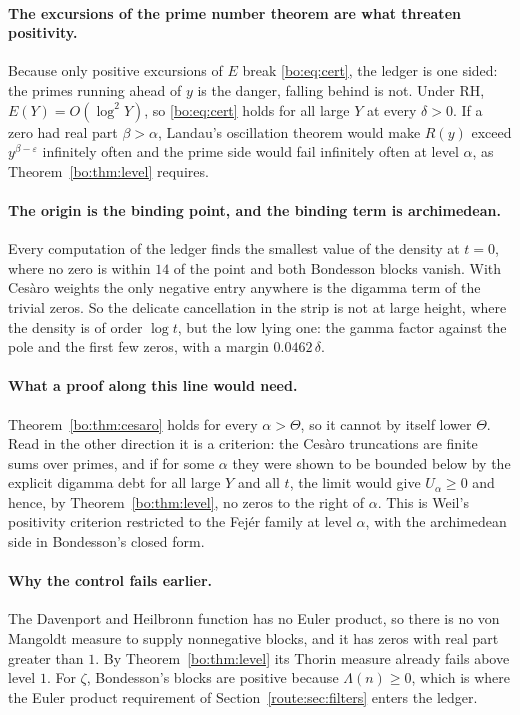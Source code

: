 \paragraph{The excursions of the prime number theorem are what threaten positivity.} Because only positive excursions of $E$ break \eqref{bo:eq:cert}, the ledger is one sided: the primes running ahead of $y$ is the danger, falling behind is not. Under RH, $E(Y)=O(\log^2Y)$, so \eqref{bo:eq:cert} holds for all large $Y$ at every $\delta>0$. If a zero had real part $\beta>\alpha$, Landau's oscillation theorem would make $R(y)$ exceed $y^{\beta-\varepsilon}$ infinitely often and the prime side would fail infinitely often at level $\alpha$, as Theorem~\ref{bo:thm:level} requires.

\paragraph{The origin is the binding point, and the binding term is archimedean.} Every computation of the ledger finds the smallest value of the density at $t=0$, where no zero is within $14$ of the point and both Bondesson blocks vanish. With Ces\`aro weights the only negative entry anywhere is the digamma term of the trivial zeros. So the delicate cancellation in the strip is not at large height, where the density is of order $\log t$, but the low lying one: the gamma factor against the pole and the first few zeros, with a margin $0.0462\,\delta$.

\paragraph{What a proof along this line would need.} Theorem~\ref{bo:thm:cesaro} holds for every $\alpha>\Theta$, so it cannot by itself lower $\Theta$. Read in the other direction it is a criterion: the Ces\`aro truncations are finite sums over primes, and if for some $\alpha$ they were shown to be bounded below by the explicit digamma debt for all large $Y$ and all $t$, the limit would give $U_\alpha\ge0$ and hence, by Theorem~\ref{bo:thm:level}, no zeros to the right of $\alpha$. This is Weil's positivity criterion restricted to the Fej\'er family at level $\alpha$, with the archimedean side in Bondesson's closed form.

\paragraph{Why the control fails earlier.} The Davenport and Heilbronn function has no Euler product, so there is no von Mangoldt measure to supply nonnegative blocks, and it has zeros with real part greater than $1$. By Theorem~\ref{bo:thm:level} its Thorin measure already fails above level $1$. For $\zeta$, Bondesson's blocks are positive because $\Lambda(n)\ge0$, which is where the Euler product requirement of Section~\ref{route:sec:filters} enters the ledger.

